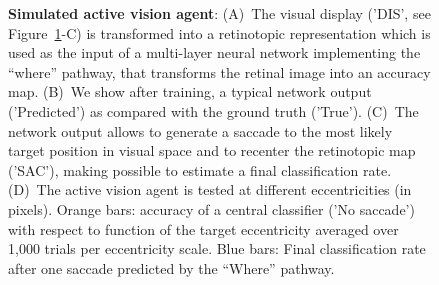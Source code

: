 \begin{figure}[t!]%
\caption{
{\bf Simulated active vision agent}:
(A)~The visual display ('DIS', see  Figure~\ref{fig:results}-C)  is transformed into a retinotopic representation which is used as the input of a multi-layer neural network implementing the ``where'' pathway, that transforms the retinal image into an accuracy map. (B)~We show after training, a typical network output  ('Predicted') as compared  with the ground truth ('True'). (C)~The network output allows to generate a saccade to the most likely target position in visual space and to recenter the retinotopic map ('SAC'), making possible to estimate a final classification rate. (D)~The active vision agent is tested at different eccentricities (in pixels). Orange bars: accuracy of a central classifier ('No saccade') with respect to  function of the target eccentricity averaged over 1,000 trials per eccentricity scale. Blue bars: Final classification rate after one saccade predicted by the ``Where'' pathway.
\label{fig:results}}%
\end{figure}%


